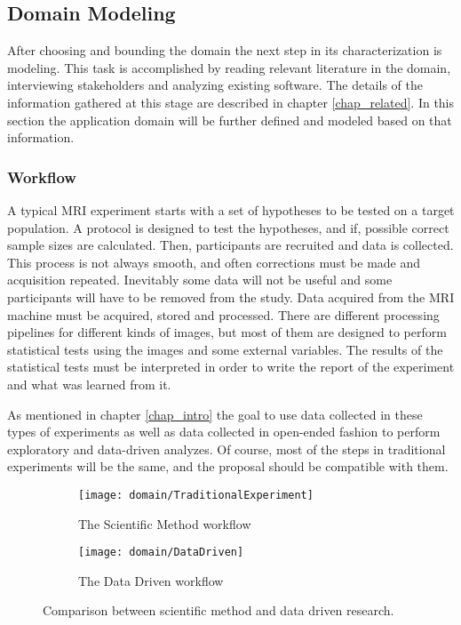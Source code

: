 
%


\subsection{Domain Modeling}

After choosing and bounding the domain the next step in its characterization is modeling. This task is accomplished by reading relevant literature in the domain, interviewing stakeholders and analyzing existing software. The details of the information gathered at this stage are described in chapter \ref{chap_related}. In this section the application domain will be further defined and modeled based on that information.

\subsubsection{Workflow}
A typical MRI experiment starts with a set of hypotheses to be tested on a target population. A protocol is designed to test the hypotheses, and if, possible correct sample sizes are calculated. Then, participants are recruited and data is collected. This process is not always smooth, and often corrections must be made and acquisition repeated. Inevitably some data will not be useful and some participants will have to be removed from the study. Data acquired from the MRI machine must be acquired, stored and processed. There are different processing pipelines for different kinds of images, but most of them are designed to perform statistical tests using the images and some external variables. The results of the statistical tests must be interpreted in order to write the report of the experiment and what was learned from it.

As mentioned in chapter \ref{chap_intro} the goal to use data collected in these types of experiments as well as data collected in open-ended fashion to perform exploratory and data-driven analyzes. Of course, most of the steps in traditional experiments will be the same, and the proposal should be compatible with them. 

\begin{figure}
\centering
\begin{subfigure}[b]{\textwidth}
\texttt{[image: domain/TraditionalExperiment]}
\caption{The Scientific Method workflow}	
\end{subfigure}

\begin{subfigure}[b]{\textwidth}
\texttt{[image: domain/DataDriven]}	
\caption{The Data Driven workflow}	
\end{subfigure}

\caption{\label{fig_workflows}Comparison between scientific method and data driven research.}
\end{figure}

